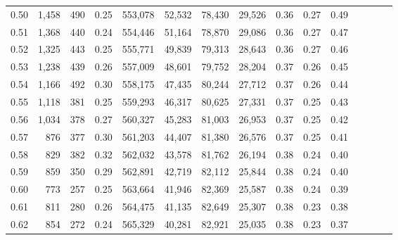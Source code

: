 \begin{tabular}{rrrcrrrrrrrrrrr}
0.50 &   1,458 &    490 &                                       0.25 &  553,078 &   52,532 &   78,430 &   29,526 &  0.36 &  0.27 &                         0.49 \\
0.51 &   1,368 &    440 &                                       0.24 &  554,446 &   51,164 &   78,870 &   29,086 &  0.36 &  0.27 &                         0.47 \\
0.52 &   1,325 &    443 &                                       0.25 &  555,771 &   49,839 &   79,313 &   28,643 &  0.36 &  0.27 &                         0.46 \\
0.53 &   1,238 &    439 &                                       0.26 &  557,009 &   48,601 &   79,752 &   28,204 &  0.37 &  0.26 &                         0.45 \\
0.54 &   1,166 &    492 &                                       0.30 &  558,175 &   47,435 &   80,244 &   27,712 &  0.37 &  0.26 &                         0.44 \\
0.55 &   1,118 &    381 &                                       0.25 &  559,293 &   46,317 &   80,625 &   27,331 &  0.37 &  0.25 &                         0.43 \\
0.56 &   1,034 &    378 &                                       0.27 &  560,327 &   45,283 &   81,003 &   26,953 &  0.37 &  0.25 &                         0.42 \\
0.57 &     876 &    377 &                                       0.30 &  561,203 &   44,407 &   81,380 &   26,576 &  0.37 &  0.25 &                         0.41 \\
0.58 &     829 &    382 &                                       0.32 &  562,032 &   43,578 &   81,762 &   26,194 &  0.38 &  0.24 &                         0.40 \\
0.59 &     859 &    350 &                                       0.29 &  562,891 &   42,719 &   82,112 &   25,844 &  0.38 &  0.24 &                         0.40 \\
0.60 &     773 &    257 &                                       0.25 &  563,664 &   41,946 &   82,369 &   25,587 &  0.38 &  0.24 &                         0.39 \\
0.61 &     811 &    280 &                                       0.26 &  564,475 &   41,135 &   82,649 &   25,307 &  0.38 &  0.23 &                         0.38 \\
0.62 &     854 &    272 &                                       0.24 &  565,329 &   40,281 &   82,921 &   25,035 &  0.38 &  0.23 &                         0.37 \\

\end{tabular}
